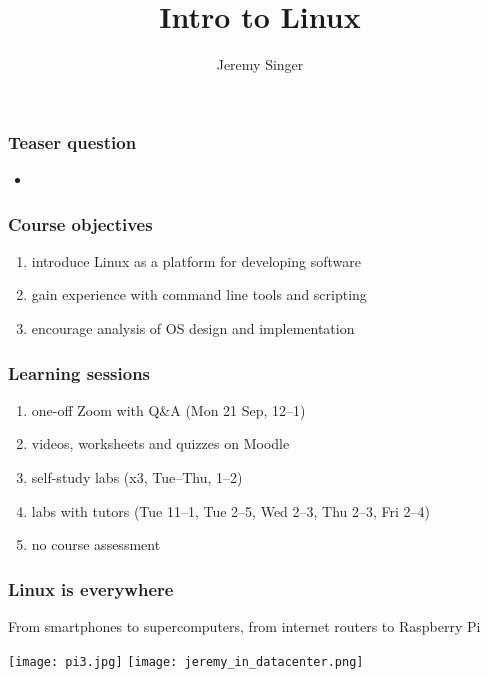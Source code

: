 \documentclass[17pt]{beamer}
\begin{document}
\title{Intro to Linux}
\author{Jeremy Singer}

\frame{\titlepage}

\begin{frame}
  \frametitle{Teaser question}
  \begin{itemize}
  \item {}
  \end{itemize}
\end{frame}


\begin{frame}
\frametitle{Course objectives}
\begin{enumerate}
\item introduce Linux as a platform for developing software
\item gain experience with command line tools and scripting
\item encourage analysis of OS design and implementation
\end{enumerate}
\end{frame}

\begin{frame}
\frametitle{Learning sessions}
\begin{enumerate}
\item one-off Zoom with Q\&A (Mon 21 Sep, 12--1)
\item videos, worksheets and quizzes on Moodle
\item self-study labs (x3, Tue--Thu, 1--2)
\item labs with tutors (Tue 11--1, Tue 2--5, Wed 2--3, Thu 2--3, Fri 2--4)
\item no course assessment
\end{enumerate}
\end{frame}


\begin{frame}
\frametitle{Linux is everywhere}

From smartphones to supercomputers, from internet routers to Raspberry Pi

\begin{center}
  \texttt{[image: pi3.jpg]}\hspace{10mm}%
  \texttt{[image: jeremy\_in\_datacenter.png]}
\end{center}
\end{frame}
\end{document}

